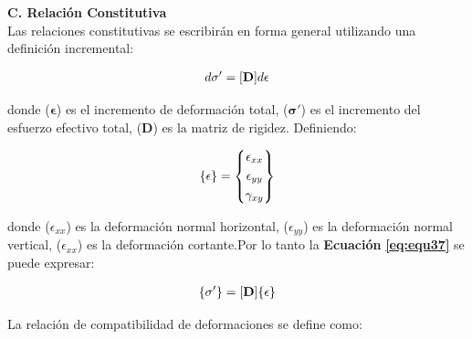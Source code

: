 \textbf{C. Relación Constitutiva}
\\
Las relaciones constitutivas se escribirán en forma general utilizando una definición incremental:
\begin{ceqn} 
\begin{gather} \label{eq:equ37} 
\normalsize{d\mathbf{\sigma}'=[\mathbf{D}] d\mathbf{\epsilon}}
\end{gather}  
\end{ceqn}
donde ($\mathbf{\epsilon}$) es el incremento de deformación total, ($\mathbf{\sigma'}$) es el incremento del esfuerzo efectivo total, ($\mathbf{D}$) es la matriz de rigidez. Definiendo:

\begin{ceqn} 
\begin{gather} \label{eq:equ38} 
\normalsize{ \{\mathbf{\epsilon}\} = \begin{Bmatrix} 
       \epsilon_{xx}\\[0.3em]
       \epsilon_{yy}\\[0.3em]
       \gamma_{xy}
       \end{Bmatrix}}
\end{gather}  
\end{ceqn}
donde ($\epsilon_{xx}$) es la deformación normal horizontal, ($\epsilon_{yy}$) es la deformación normal vertical, ($\epsilon_{xx}$) es la deformación cortante.Por lo tanto la \textbf{Ecuación} \textbf{\ref{eq:equ37}} se puede expresar:

\begin{ceqn} 
\begin{gather} \label{eq:equ39} 
\normalsize{\{\mathbf{\sigma'}\}=[\mathbf{D}] \{\mathbf{\epsilon}\}}
\end{gather}  
\end{ceqn}

La relación de compatibilidad de deformaciones se define como:

